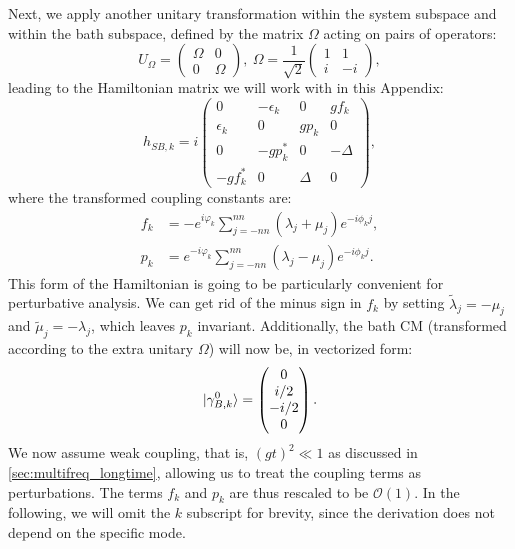 Next, we apply another unitary transformation within the system subspace and within the bath subspace, defined by the matrix $\Omega$ acting on pairs of operators:
\begin{equation}
    U_\Omega=\begin{pmatrix}
        \Omega &0\\
        0      &\Omega
    \end{pmatrix},\ \Omega = \frac{1}{\sqrt{2}} \begin{pmatrix}
        1 &1\\
        i &-i
    \end{pmatrix},
    \label{eq:omega_transform}
\end{equation}
leading to the Hamiltonian matrix we will work with in this Appendix:
\begin{equation}
    h_{SB,k} = i \begin{pmatrix}
        0          &-\epsilon_k &0      &gf_k\\
        \epsilon_k &0           &gp_k   &0\\
        0          &-gp_k^*     &0      &-\Delta\\
        -gf_k^*    &0           &\Delta &0
    \end{pmatrix},
    \label{eq:final_Hsb_pm_k}
\end{equation}
where the transformed coupling constants are:
\begin{align}
    f_k &= -e^{i\varphi_k} \sum_{j=-nn}^{nn} (\lambda_j + \mu_j) e^{-i\phi_k j},\\
    p_k &= e^{-i\varphi_k} \sum_{j=-nn}^{nn} (\lambda_j - \mu_j) e^{-i\phi_k j}.
\end{align}
This form of the Hamiltonian is going to be particularly convenient for perturbative analysis.
We can get rid of the minus sign in $f_k$ by setting $\tilde{\lambda}_j = -\mu_j$ and $\tilde{\mu}_j = -\lambda_j$, which leaves $p_k$ invariant. Additionally, the bath CM (transformed according to the extra unitary $\Omega$) will now be, in vectorized form:
\begin{equation}
    \ket{\gamma_{B,k}^{0}}=\begin{pmatrix}
        0\\
        i/2\\
        -i/2\\
        0
    \end{pmatrix}.
\end{equation}
We now assume weak coupling, that is, $(gt)^2\ll 1$ as discussed in \cref{sec:multifreq_longtime}, allowing us to treat the coupling terms as perturbations. The terms $f_k$ and $p_k$ are thus rescaled to be $\mathcal{O}(1)$. In the following, we will omit the $k$ subscript for brevity, since the derivation does not depend on the specific mode.

